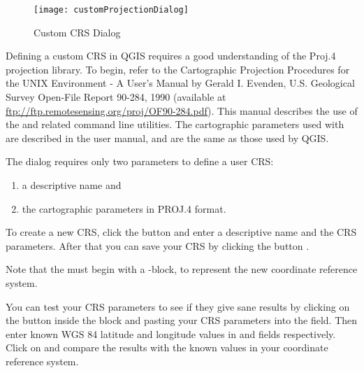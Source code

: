 \begin{figure}[ht]
   \centering
   \texttt{[image: customProjectionDialog]}
   \caption{Custom CRS Dialog \nixcaption}\label{fig:customprojections}
\end{figure}

Defining a custom CRS in QGIS requires a good understanding of the Proj.4
projection library. To begin, refer to the Cartographic Projection Procedures
for the UNIX Environment - A User's Manual by Gerald I. Evenden, U.S.
Geological Survey Open-File Report 90-284, 1990 (available at \url{ftp://ftp.remotesensing.org/proj/OF90-284.pdf}).
This manual describes the use of the  and related command line
utilities. The cartographic parameters used with  are
described in the user manual, and are the same as those used by QGIS. 

The  dialog requires
only two parameters to define a user CRS: 
\begin{enumerate}
\item a descriptive name and
\item the cartographic parameters in PROJ.4 format.
\end{enumerate}
To create a new CRS, click the  button and enter a
descriptive name and the CRS parameters. After that you can save your CRS by
clicking the button .

Note that the  must begin with a -block,
to represent the new coordinate reference system.

You can test your CRS parameters to see if they give sane results by
clicking on the  button inside the  block 
and pasting your CRS parameters into
the  field. Then enter known WGS 84 latitude and longitude
values in  and  fields respectively. 
Click on  and compare the results with the known values in
your coordinate reference system.

\FloatBarrier
